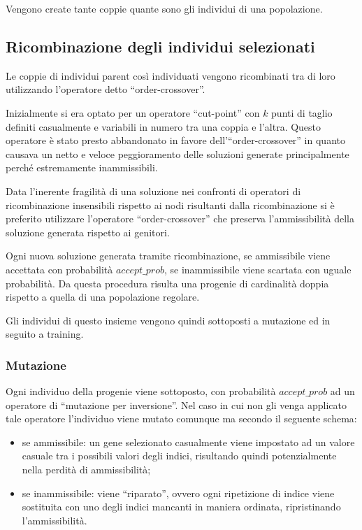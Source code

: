 \documentclass[a4paper]{article}
\begin{document}
            Vengono create tante coppie quante sono gli individui di una popolazione.
        
        \subsection{Ricombinazione degli individui selezionati}
            Le coppie di individui parent cos\`i individuati vengono ricombinati tra di loro utilizzando l'operatore detto
            ``order-crossover''.

            Inizialmente si era optato per un operatore ``cut-point'' con $k$ punti di taglio definiti casualmente e variabili
            in numero tra una coppia e l'altra.
            Questo operatore \`e stato presto abbandonato in favore dell'``order-crossover'' in quanto causava un netto e veloce
            peggioramento delle soluzioni generate principalmente perch\'e estremamente inammissibili.

            Data l'inerente fragilit\`a di una soluzione nei confronti di operatori di ricombinazione insensibili rispetto ai nodi
            risultanti dalla ricombinazione si \`e preferito utilizzare l'operatore ``order-crossover'' che preserva l'ammissibilit\`a
            della soluzione generata rispetto ai genitori.

            Ogni nuova soluzione generata tramite ricombinazione, se ammissibile viene accettata con probabilit\`a $accept\_prob$,
            se inammissibile viene scartata con uguale probabilit\`a.
            Da questa procedura risulta una progenie di cardinalit\`a doppia rispetto a quella di una popolazione regolare.

            Gli individui di questo insieme vengono quindi sottoposti a mutazione ed in seguito a training.

            \subsubsection{Mutazione}
                Ogni individuo della progenie viene sottoposto, con probabilit\`a $accept\_prob$ ad un operatore di ``mutazione per inversione''.
                Nel caso in cui non gli venga applicato tale operatore l'individuo viene mutato comunque ma secondo il seguente schema:
                \begin{itemize}
                    \item se ammissibile: un gene selezionato casualmente viene impostato ad un valore casuale tra i possibili valori degli indici,
                        risultando quindi potenzialmente nella perdit\`a di ammissibilit\`a;
                    \item se inammissibile: viene ``riparato'', ovvero ogni ripetizione di indice viene sostituita con uno degli indici mancanti in maniera ordinata,
                        ripristinando l'ammissibilit\`a.
                \end{itemize}
\end{document}
